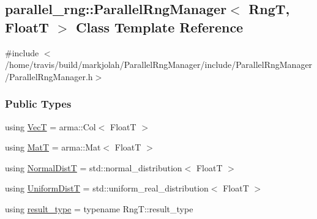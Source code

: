 \hypertarget{classparallel__rng_1_1ParallelRngManager}{}\subsection{parallel\+\_\+rng\+:\+:Parallel\+Rng\+Manager$<$ RngT, FloatT $>$ Class Template Reference}
\label{classparallel__rng_1_1ParallelRngManager}


{\ttfamily \#include $<$/home/travis/build/markjolah/\+Parallel\+Rng\+Manager/include/\+Parallel\+Rng\+Manager/\+Parallel\+Rng\+Manager.\+h$>$}

\subsubsection*{Public Types}
\begin{DoxyCompactItemize}
\item 
using \hyperlink{classparallel__rng_1_1ParallelRngManager_a85a7225592fc063e7c0bb6d1c947f177}{VecT} = arma\+::\+Col$<$ FloatT $>$
\item 
using \hyperlink{classparallel__rng_1_1ParallelRngManager_af73ca29a72b66f92794f435a6163770d}{MatT} = arma\+::\+Mat$<$ FloatT $>$
\item 
using \hyperlink{classparallel__rng_1_1ParallelRngManager_a8eebc9754ce2a75faeca6b9736d2872f}{Normal\+DistT} = std\+::normal\+\_\+distribution$<$ FloatT $>$
\item 
using \hyperlink{classparallel__rng_1_1ParallelRngManager_a5df9dbb440b976fbc769d564dfccb597}{Uniform\+DistT} = std\+::uniform\+\_\+real\+\_\+distribution$<$ FloatT $>$
\item 
using \hyperlink{classparallel__rng_1_1ParallelRngManager_a199ad0d83c322a1f4415280002dcb386}{result\+\_\+type} = typename Rng\+T\+::result\+\_\+type
\end{DoxyCompactItemize}
